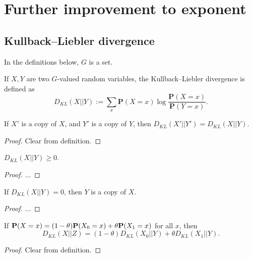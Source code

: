 \chapter{Further improvement to exponent}

\section{Kullback--Liebler divergence}

In the definitions below, $G$ is a set.

\begin{definition}\label{kl-div} If $X,Y$ are two $G$-valued random variables, the Kullback--Liebler divergence is defined as
  $$ D_{KL}(X||Y) := \sum_x \mathbf{P}(X=x) \log \frac{\mathbf{P}(X=x)}{\mathbf{P}(Y=x)}.$$
\end{definition}

\begin{lemma}\label{kl-div-copy}  If $X'$ is a copy of $X$, and $Y'$ is a copy of $Y$, then $D_{KL}(X'||Y') = D_{KL}(X||Y)$.
\end{lemma}

\begin{proof}  Clear from definition.
\end{proof}

\begin{lemma}\label{Gibbs}  $D_{KL}(X||Y) \geq 0$.
\end{lemma}

\begin{proof} ...
\end{proof}

\begin{lemma}\label{Gibbs-converse}  If $D_{KL}(X||Y) = 0$, then $Y$ is a copy of $X$.
\end{lemma}

\begin{proof} ...
\end{proof}

\begin{lemma}\label{kl-div-convex}  If ${\bf P}(X=x) = (1-\theta) {\bf P}(X_0=x) + \theta {\bf P}(X_1=x)$ for all $x$, then
$$D_{KL}(X||Z) = (1-\theta) D_{KL}(X_0||Y) + \theta D_{KL}(X_1||Y).$$
\end{lemma}

\begin{proof} Clear from definition.
\end{proof}

